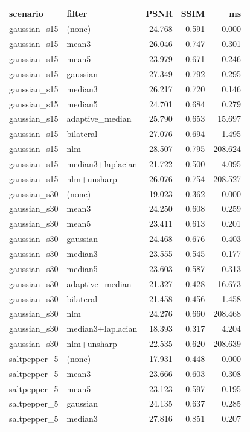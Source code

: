 \begin{tabular}{llrrr}
\toprule
scenario & filter & PSNR & SSIM & ms \\
\midrule
gaussian_s15 & (none) & 24.768 & 0.591 & 0.000 \\
gaussian_s15 & mean3 & 26.046 & 0.747 & 0.301 \\
gaussian_s15 & mean5 & 23.979 & 0.671 & 0.246 \\
gaussian_s15 & gaussian & 27.349 & 0.792 & 0.295 \\
gaussian_s15 & median3 & 26.217 & 0.720 & 0.146 \\
gaussian_s15 & median5 & 24.701 & 0.684 & 0.279 \\
gaussian_s15 & adaptive_median & 25.790 & 0.653 & 15.697 \\
gaussian_s15 & bilateral & 27.076 & 0.694 & 1.495 \\
gaussian_s15 & nlm & 28.507 & 0.795 & 208.624 \\
gaussian_s15 & median3+laplacian & 21.722 & 0.500 & 4.095 \\
gaussian_s15 & nlm+unsharp & 26.076 & 0.754 & 208.527 \\
gaussian_s30 & (none) & 19.023 & 0.362 & 0.000 \\
gaussian_s30 & mean3 & 24.250 & 0.608 & 0.259 \\
gaussian_s30 & mean5 & 23.411 & 0.613 & 0.201 \\
gaussian_s30 & gaussian & 24.468 & 0.676 & 0.403 \\
gaussian_s30 & median3 & 23.555 & 0.545 & 0.177 \\
gaussian_s30 & median5 & 23.603 & 0.587 & 0.313 \\
gaussian_s30 & adaptive_median & 21.327 & 0.428 & 16.673 \\
gaussian_s30 & bilateral & 21.458 & 0.456 & 1.458 \\
gaussian_s30 & nlm & 24.276 & 0.660 & 208.468 \\
gaussian_s30 & median3+laplacian & 18.393 & 0.317 & 4.204 \\
gaussian_s30 & nlm+unsharp & 22.535 & 0.620 & 208.639 \\
saltpepper_5 & (none) & 17.931 & 0.448 & 0.000 \\
saltpepper_5 & mean3 & 23.666 & 0.603 & 0.308 \\
saltpepper_5 & mean5 & 23.123 & 0.597 & 0.195 \\
saltpepper_5 & gaussian & 24.135 & 0.637 & 0.285 \\
saltpepper_5 & median3 & 27.816 & 0.851 & 0.207 \\

\end{tabular}
